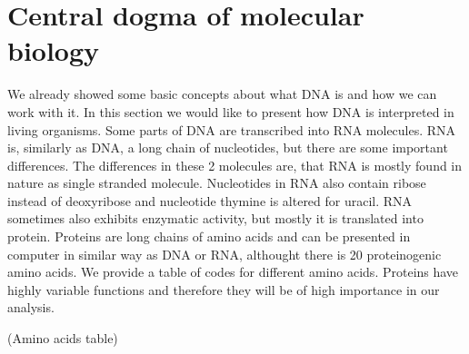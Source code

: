 
\section{Central dogma of molecular biology}
We already showed some basic concepts about what DNA is and how we can work with it.
In this section we would like to present how DNA is interpreted in living organisms.
Some parts of DNA are transcribed into RNA molecules.
RNA is, similarly as DNA, a long chain of nucleotides, but there are some important differences.
The differences in these 2 molecules are, that RNA is mostly found in nature as single stranded molecule.
Nucleotides in RNA also contain ribose instead of deoxyribose and nucleotide thymine is altered for uracil.
RNA sometimes also exhibits enzymatic activity, but mostly it is translated into protein.
Proteins are long chains of amino acids and can be presented in computer in similar way as DNA or RNA, althought there is 20 proteinogenic amino acids.
We provide a table of codes for different amino acids.
Proteins have highly variable functions and therefore they will be of high importance in our analysis.

\medskip
(Amino acids table)
\medskip





